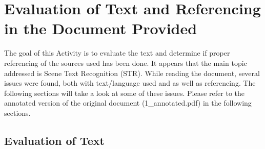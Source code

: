 \chapter*{Evaluation of Text and Referencing in the Document Provided}
\label{chap1}

The goal of this Activity is to evaluate the text and determine if proper referencing of the sources used has been done. It appears that the main topic addressed is Scene Text Recognition (STR). While reading the document, several issues were found, both with text/language used and as well as referencing. The following sections will take a look at some of these issues. Please refer to the annotated version of the original document (1\_annotated.pdf) in the following sections.

\section*{Evaluation of Text} 
